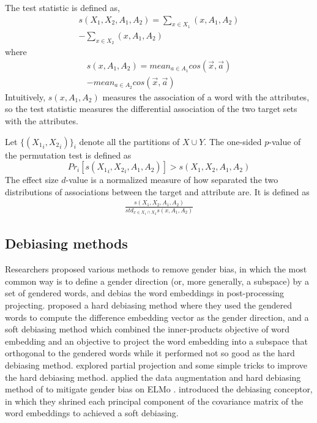 The test statistic is defined as,
\begin{eqnarray}
s(X_1,X_2,A_1,A_2)=\sum_{x\in X_1}(x,A_1,A_2)\nonumber\\
-\sum_{x\in X_2}(x,A_1,A_2)\nonumber
\end{eqnarray}
where
\begin{eqnarray}
s(x,A_1,A_2)=mean_{a\in A_1}cos(\vec{x},\vec{a})\nonumber\\
-mean_{a\in A_2}cos(\vec{x},\vec{a})\nonumber
\end{eqnarray}
Intuitively, $s(x,A_1,A_2)$ measures the association of a word with the attributes, so the test statistic measures the differential association of the two target sets with the attributes. 

Let $\{({X_1}_i,{X_2}_i)\}_{i}$ denote all the partitions of $X\cup Y$. The one-sided $p$-value of the permutation test is defined as $$Pr_i[s({X_1}_i,{X_2}_i,A_1,A_2)]>s(X_1,X_2,A_1,A_2)$$
The effect size $d$-value is a normalized measure of how separated the two distributions of associations between the target and attribute are. It is defined as
\begin{eqnarray}
\frac{s(X_1,X_2,A_1,A_2)}{std_{x\in X_1 \cap X_2}s(x,A_1,A_2)}\nonumber
\end{eqnarray}

\subsection{Debiasing methods}
Researchers proposed various methods to remove gender bias, in which the most common way is to define a gender direction (or, more generally, a subspace) by a set of gendered words, and debias the word embeddings in post-processing projecting. \citet{bolukbasi2016man} proposed a hard debiasing method where they used the gendered words to compute the difference embedding vector as the gender direction, and a soft debiasing method which combined the inner-products objective of word embedding and an objective to project the word embedding into a subspace that orthogonal to the gendered words while it performed not so good as the hard debiasing method. \citet{dev2019attenuating} explored partial projection and some simple tricks to improve the hard debiasing method. \citet{zhao2019gender} applied the data augmentation and hard debiasing method of \citet{bolukbasi2016man} to mitigate gender bias on ELMo \citep{Peters:2018}. \citet{karve2019conceptor} introduced the debiasing conceptor, in which they shrined each principal component of the covariance matrix of the word embeddings to achieved a soft debiasing.

